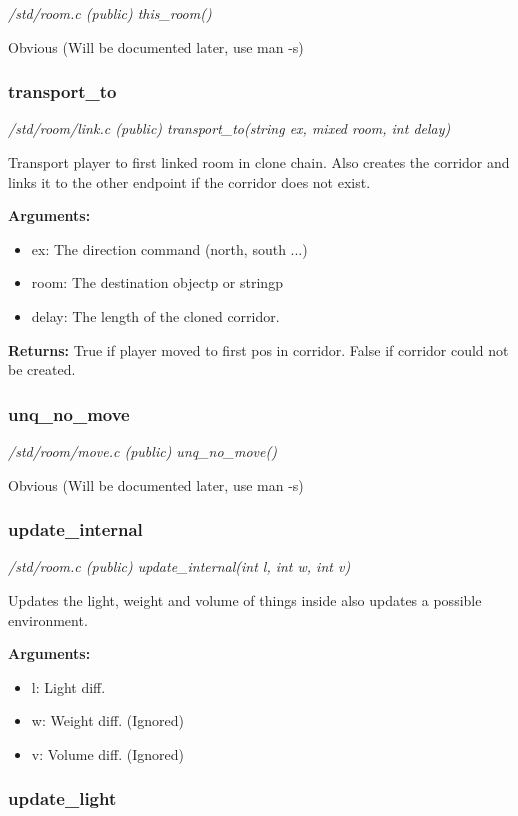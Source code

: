 {\em /std/room.c (public) this\_room()}

Obvious (Will be documented later, use man -s)


\subsubsection{transport\_to}

{\em /std/room/link.c (public) transport\_to(string ex, mixed room, int delay)}

Transport player to first linked room in clone chain.  
Also creates the corridor and links it to the other
endpoint if the corridor does not exist.

{\bf Arguments:}
\begin{itemize}
\item     ex:    The direction command (north, south ...)
\item room:  The destination objectp or stringp
\item delay: The length of the cloned corridor.
\end{itemize}

{\bf Returns:}        True if player moved to first pos in corridor.
False if corridor could not be created.


\subsubsection{unq\_no\_move}

{\em /std/room/move.c (public) unq\_no\_move()}

Obvious (Will be documented later, use man -s) 


\subsubsection{update\_internal}

{\em /std/room.c (public) update\_internal(int l, int w, int v)}

Updates the light, weight and volume of things inside
also updates a possible environment.

{\bf Arguments:}
\begin{itemize}
\item      l: Light diff.
\item w: Weight diff. (Ignored)
\item v: Volume diff. (Ignored)
\end{itemize}


\subsubsection{update\_light}

